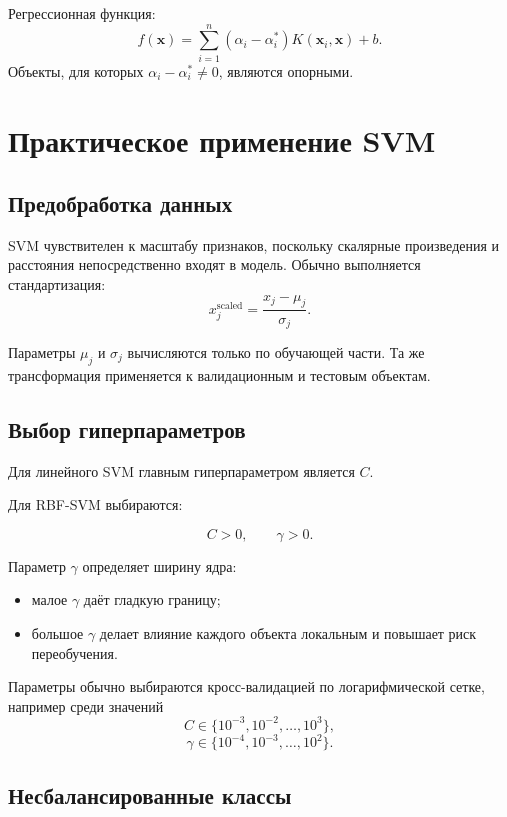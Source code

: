 \documentclass[12pt,a4paper]{article}
\theoremstyle{definition}
\newcommand{\1}{\mathbf{1}}
\begin{document}
Регрессионная функция:
\[
    f(\bm{x})
    =
    \sum_{i=1}^{n}
    (\alpha_i-\alpha_i^{*})
    K(\bm{x}_i,\bm{x})
    +
    b.
\]
Объекты, для которых
$\alpha_i-\alpha_i^{*}\neq0$, являются опорными.

\section{Практическое применение SVM}

\subsection{Предобработка данных}

SVM чувствителен к масштабу признаков, поскольку скалярные произведения
и расстояния непосредственно входят в модель. Обычно выполняется
стандартизация:
\[
    x_j^{\mathrm{scaled}}
    =
    \frac{x_j-\mu_j}{\sigma_j}.
\]

Параметры $\mu_j$ и $\sigma_j$ вычисляются только по обучающей части.
Та же трансформация применяется к валидационным и тестовым объектам.

\subsection{Выбор гиперпараметров}

Для линейного SVM главным гиперпараметром является $C$.

Для RBF-SVM выбираются:

\[
    C>0,
    \qquad
    \gamma>0.
\]

Параметр $\gamma$ определяет ширину ядра:

\begin{itemize}
    \item малое $\gamma$ даёт гладкую границу;
    \item большое $\gamma$ делает влияние каждого объекта локальным
    и повышает риск переобучения.
\end{itemize}

Параметры обычно выбираются кросс-валидацией по логарифмической сетке,
например среди значений
\[
    C\in\{10^{-3},10^{-2},\ldots,10^3\},
\]
\[
    \gamma\in\{10^{-4},10^{-3},\ldots,10^2\}.
\]

\subsection{Несбалансированные классы}
\end{document}
